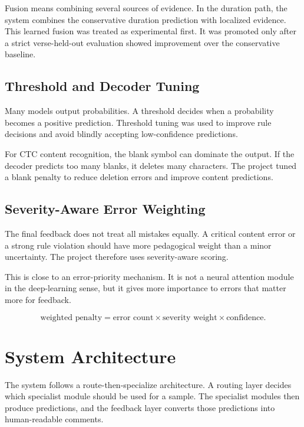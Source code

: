 Fusion means combining several sources of evidence. In the duration path, the
system combines the conservative duration prediction with localized evidence.
This learned fusion was treated as experimental first. It was promoted only
after a strict verse-held-out evaluation showed improvement over the
conservative baseline.

\subsection{Threshold and Decoder Tuning}

Many models output probabilities. A threshold decides when a probability becomes
a positive prediction. Threshold tuning was used to improve rule decisions and
avoid blindly accepting low-confidence predictions.

For CTC content recognition, the blank symbol can dominate the output. If the
decoder predicts too many blanks, it deletes many characters. The project tuned
a blank penalty to reduce deletion errors and improve content predictions.

\subsection{Severity-Aware Error Weighting}

The final feedback does not treat all mistakes equally. A critical content error
or a strong rule violation should have more pedagogical weight than a minor
uncertainty. The project therefore uses severity-aware scoring.

This is close to an error-priority mechanism. It is not a neural attention
module in the deep-learning sense, but it gives more importance to errors that
matter more for feedback.

\begin{equation}
\text{weighted penalty}
= \text{error count} \times \text{severity weight} \times \text{confidence}.
\end{equation}

\section{System Architecture}

The system follows a route-then-specialize architecture. A routing layer decides
which specialist module should be used for a sample. The specialist modules then
produce predictions, and the feedback layer converts those predictions into
human-readable comments.

